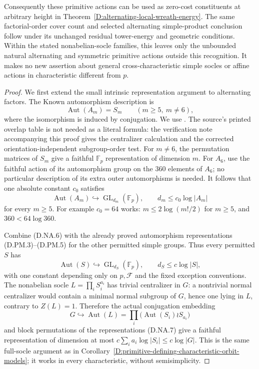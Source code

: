 \begin{corollary}
Consequently these primitive actions can be used as
zero-cost constituents at arbitrary height in
Theorem~\ref{D:alternating-local-wreath-energy}.
The same factorial-order cover count and selected
alternating simple-product conclusion follow under its
unchanged residual tower-energy and geometric conditions.
Within the stated nonabelian-socle families, this leaves
only the unbounded natural alternating and symmetric
primitive actions outside this recognition. It makes no
new assertion about general cross-characteristic simple
socles or affine actions in characteristic different
from $p$.
\end{corollary}

\begin{proof}
We first extend the small intrinsic representation argument
to alternating factors. The Known automorphism description is
\[
                 \operatorname{Aut}(A_m)=S_m
                       \qquad(m\ge5,\ m\ne6),           \tag{D.NA.5}
\]
where the isomorphism is induced by conjugation. We use
\citet[Theorems 11.2 and 11.7, with Lemmas 11.3--11.5,
pp.~42--44]{C_Lyons1999AlternatingAutomorphisms}.
The source's printed overlap table is not needed as a
literal formula: the verification note accompanying this
proof gives the centralizer calculation and the corrected
orientation-independent subgroup-order test.
For $m\ne6$, the permutation matrices of $S_m$ give
a faithful $\mathbb F_p$ representation of dimension $m$.
For $A_6$, use the faithful action of its automorphism
group on the $360$ elements of $A_6$; no particular
description of its extra outer automorphisms is needed.
It follows that one absolute constant $c_0$ satisfies
\[
 \operatorname{Aut}(A_m)\hookrightarrow
       \operatorname{GL}_{d_m}(\mathbb F_p),\qquad
                         d_m\le c_0\log|A_m|             \tag{D.NA.6}
\]
for every $m\ge5$. For example $c_0=64$ works:
$m\le2\log(m!/2)$ for $m\ge5$, and
$360<64\log360$.

Combine (D.NA.6) with the already proved automorphism
representations (D.PM.3)--(D.PM.5) for the other permitted
simple groups. Thus every permitted $S$ has
\[
 \operatorname{Aut}(S)\hookrightarrow
       \operatorname{GL}_{d_S}(\mathbb F_p),\qquad
                         d_S\le c\log|S|,               \tag{D.NA.7}
\]
with one constant depending only on $p,\mathcal F$ and
the fixed exception conventions. The nonabelian socle
$L=\prod_i S_i^{a_i}$ has trivial centralizer in $G$:
a nontrivial normal centralizer would contain a minimal
normal subgroup of $G$, hence one lying in $L$, contrary
to $Z(L)=1$. Therefore the actual conjugation embedding
\[
 G\hookrightarrow\operatorname{Aut}(L)
   =\prod_i\bigl(\operatorname{Aut}(S_i)\wr S_{a_i}\bigr)
                                                            \tag{D.NA.8}
\]
and block permutations of the representations (D.NA.7)
give a faithful representation of dimension at most
$c\sum_i a_i\log|S_i|\le c\log|G|$.
This is the same full-socle argument as in
Corollary~\ref{D:primitive-defining-characteristic-orbit-models};
it works in every characteristic, without semisimplicity.


\end{proof}
